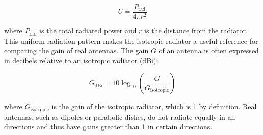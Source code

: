 \[
U = \frac{P_{\text{rad}}}{4\pi r^2}
\]

where \( P_{\text{rad}} \) is the total radiated power and \( r \) is the distance from the radiator. This uniform radiation pattern makes the isotropic radiator a useful reference for comparing the gain of real antennas. The gain \( G \) of an antenna is often expressed in decibels relative to an isotropic radiator (dBi):

\[
G_{\text{dBi}} = 10 \log_{10} \left( \frac{G}{G_{\text{isotropic}}} \right)
\]

where \( G_{\text{isotropic}} \) is the gain of the isotropic radiator, which is 1 by definition. Real antennas, such as dipoles or parabolic dishes, do not radiate equally in all directions and thus have gains greater than 1 in certain directions.

